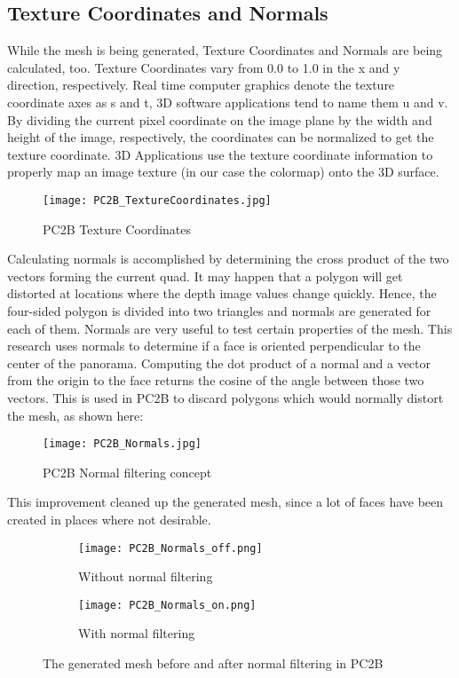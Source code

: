 \subsection{Texture Coordinates and Normals}  \label{section_texture_coordinates_and_normals}

While the mesh is being generated, Texture Coordinates and Normals are being calculated, too. Texture Coordinates vary from 0.0 to 1.0 in the x and y direction, respectively. Real time computer graphics denote the texture coordinate axes as s and t, 3D software applications tend to name them u and v. By dividing the current pixel coordinate on the image plane by the width and height of the image, respectively, the coordinates can be normalized to get the texture coordinate. 3D Applications use the texture coordinate information to properly map an image texture (in our case the colormap) onto the 3D surface.


\begin{figure}[h]
	\centering
	\texttt{[image: PC2B\_TextureCoordinates.jpg]}
	\caption{PC2B Texture Coordinates}
	\label{fig:pc2b_texture_coordinates}
\end{figure}


Calculating normals is accomplished by determining the cross product of the two vectors forming the current quad. It may happen that a polygon will get distorted at locations where the depth image values change quickly. Hence, the four-sided polygon is divided into two triangles and normals are generated for each of them. Normals are very useful to test certain properties of the mesh. This research uses normals to determine if a face is oriented perpendicular to the center of the panorama. Computing the dot product of a normal and a vector from the origin to the face returns the cosine of the angle between those two vectors. This is used in PC2B to discard polygons which would normally distort the mesh, as shown here:

\begin{figure}[h]
	\centering
	\texttt{[image: PC2B\_Normals.jpg]}
	\caption{PC2B Normal filtering concept}
	\label{fig:pc2b_normals}
\end{figure}

This improvement cleaned up the generated mesh, since a lot of faces have been created in places where not desirable.


\begin{figure}[h]
	\centering
	\begin{subfigure}[b]{0.45\textwidth}
		\centering
		\texttt{[image: PC2B\_Normals\_off.png]}
		\caption{Without normal filtering}
		\label{fig:PC2B_normals_off}
	\end{subfigure}
	\hfill
	\begin{subfigure}[b]{0.45\textwidth}
		\centering
		\texttt{[image: PC2B\_Normals\_on.png]}
		\caption{With normal filtering}
		\label{fig:PC2B_normals_on}
	\end{subfigure}
	\caption{The generated mesh before and after normal filtering in PC2B}
	\label{fig:PC2B_normal_filtering}
\end{figure}


